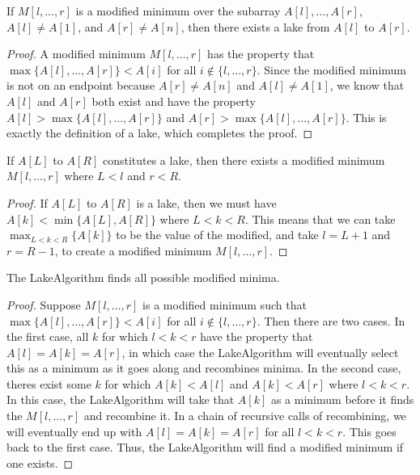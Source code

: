 \documentclass{6046}
\begin{document}
\begin{theorem}
If $M[l, \ldots, r]$ is a modified minimum over the subarray $A[l], \ldots, A[r]$, $A[l] \neq A[1]$, and $A[r] \neq A[n]$, then there exists a lake from $A[l]$ to $A[r]$. 
\end{theorem}

\begin{proof}
A modified minimum $M[l, \ldots, r]$ has the property that $\max\{A[l], \ldots, A[r] \} < A[i]$ for all $i \notin \{ l, \ldots, r \}$. Since the modified minimum is not on an endpoint because $A[r] \neq A[n]$ and $A[l] \neq A[1]$, we know that $A[l]$ and $A[r]$ both exist and have the property $A[l] > \max\{A[l], \ldots, A[r] \}$ and $A[r] > \max\{A[l], \ldots, A[r] \}$. This is exactly the definition of a lake, which completes the proof.
\end{proof}

\begin{theorem}
If $A[L]$ to $A[R]$ constitutes a lake, then there exists a modified minimum $M[l, \ldots, r]$ where $L < l$ and $r < R$. 
\end{theorem}

\begin{proof}
If $A[L]$ to $A[R]$ is a lake, then we must have $A[k] < \min\{A[L], A[R]\}$ where $L < k < R$. This means that we can take $\max_{L < k < R} \{A[k] \}$ to be the value of the modified, and take $l = L + 1$ and $r = R - 1$, to create a modified minimum $M[l, \ldots, r]$.
\end{proof}

\begin{theorem}
The LakeAlgorithm finds all possible modified minima.
\end{theorem}

\begin{proof}
Suppose $M[l, \ldots, r]$ is a modified minimum such that $\max\{ A[l], \ldots, A[r] \} < A[i]$ for all $i \notin \{l, \ldots, r \}$. Then there are two cases. In the first case, all $k$ for which $l < k < r$ have the property that $A[l] = A[k] = A[r]$, in which case the LakeAlgorithm will eventually select this as a minimum as it goes along and recombines minima. In the second case, theres exist some $k$ for which $A[k] < A[l]$ and $A[k] < A[r]$ where $l < k < r$. In this case, the LakeAlgorithm will take that $A[k]$ as a minimum before it finds the $M[l, \ldots, r]$ and recombine it. In a chain of recursive calls of recombining, we will eventually end up with $A[l] = A[k] = A[r]$ for all $l < k < r$. This goes back to the first case. Thus, the LakeAlgorithm will find a modified minimum if one exists.
\end{proof}
\end{document}
